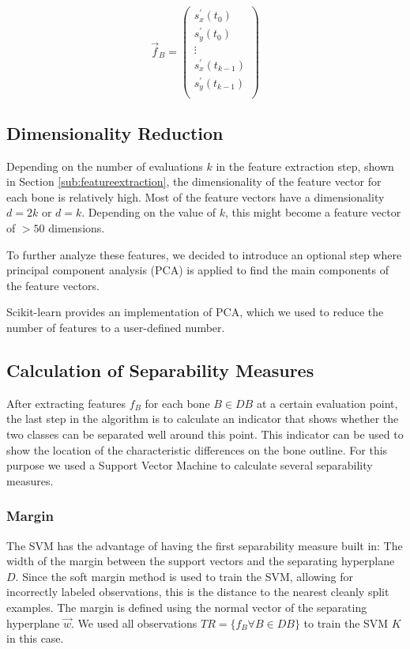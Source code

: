 \documentclass[pdftex,12pt,a4paper]{report}
\begin{document}
\begin{equation}
\vec{f}_B = \left( \begin{array}{c}
s^\prime_{x}(t_{0}) \\
s^\prime_{y}(t_{0}) \\
\vdots \\
s^\prime_{x}(t_{k-1}) \\
s^\prime_{y}(t_{k-1}) \\
\end{array} \right)  
\end{equation}

\subsection{Dimensionality Reduction}

Depending on the number of evaluations $k$ in the feature extraction step, shown in Section
\ref{sub:featureextraction}, the dimensionality of the feature vector for each bone is relatively high. Most of 
the feature vectors have a dimensionality $d = 2k$ or $d = k$. Depending on the value of $k$, this might become
a feature vector of $> 50$ dimensions.

To further analyze these features, we decided to introduce an optional step where principal component analysis
(PCA) is applied to find the main components of the feature vectors. 

Scikit-learn \cite{pedregosa2011scikit} provides an implementation of PCA, which we used to reduce the number of features to a user-defined number.

\subsection{Calculation of Separability Measures}

After extracting features $f_B$ for each bone $B \in DB$ at a certain evaluation point, the last step in the
algorithm is to calculate an indicator that shows whether the two classes can be separated well around this point.
This indicator can be used to show the location of the characteristic differences on the bone outline. For this
purpose we used a Support Vector Machine to calculate several separability measures.

\subsubsection{Margin}

The SVM has the advantage of having the first separability measure built in: The width of the margin between the
support vectors and the separating hyperplane $D$. Since the soft margin method is used to train the SVM, allowing for incorrectly labeled observations, this is the distance to the nearest cleanly split examples. The margin is 
defined using the normal vector of the separating hyperplane $\vec{w}$. We used all observations $TR = \{ f_B \forall B \in DB \}$ to train the SVM $K$ in this case.
\end{document}
